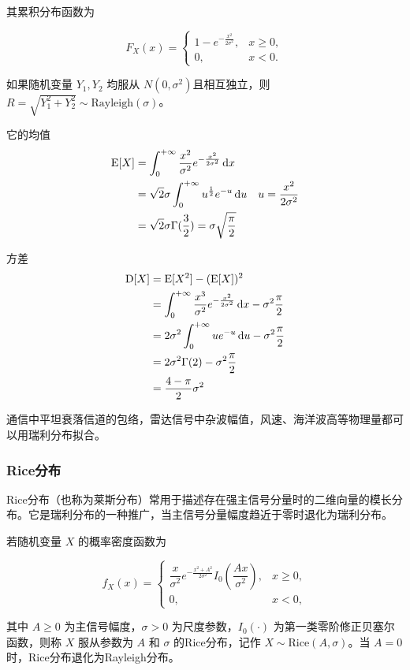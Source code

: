 其累积分布函数为

\[
F_X(x) = \begin{cases}
    1 - e^{-\frac{x^2}{2\sigma^2}}, & x \geq 0,\\
    0, & x < 0.
\end{cases}
\]

如果随机变量 $Y_1, Y_2$ 均服从 $N(0, \sigma^2)$且相互独立，则 $R = \sqrt{Y_1^2 + Y_2^2} \sim \mathrm{Rayleigh}(\sigma)$。

它的均值
\begin{align*}
\operatorname{E}[X] &= \int_{0}^{+\infty} \dfrac{x^2}{\sigma^2} e^{-\frac{x^2}{2\sigma^2}} \mathop{}\!\mathrm{d} x\\
&= \sqrt{2}\sigma\int_{0}^{+\infty} u^{\frac 12} e^{-u} \mathop{}\!\mathrm{d} u & u=\frac{x^2}{2\sigma^2}\\
&= \sqrt{2}\sigma \Gamma(\frac{3}{2}) = \sigma \sqrt{\frac{\pi}2}
\end{align*}

方差
\begin{align*}
\operatorname{D}[X] &= \operatorname{E}[X^2]- (\operatorname{E}[X])^2 \\
&= \int_{0}^{+\infty} \dfrac{x^3}{\sigma^2} e^{-\frac{x^2}{2\sigma^2}} \mathop{}\!\mathrm{d} x-\sigma^2 \frac{\pi}2\\
&= 2\sigma^2\int_{0}^{+\infty} ue^{-u} \mathop{}\!\mathrm{d} u - \sigma^2 \frac{\pi}2\\
&= 2\sigma^2\Gamma(2)-\sigma^2 \frac{\pi}2\\
&=\frac{4-\pi}{2}\sigma^2
\end{align*}

通信中平坦衰落信道的包络，雷达信号中杂波幅值，风速、海洋波高等物理量都可以用瑞利分布拟合。

\subsubsection{Rice分布}

Rice分布（也称为莱斯分布）常用于描述存在强主信号分量时的二维向量的模长分布。它是瑞利分布的一种推广，当主信号分量幅度趋近于零时退化为瑞利分布。

若随机变量 $X$ 的概率密度函数为

\[
f_X(x) = \begin{cases}
    \dfrac{x}{\sigma^2} e^{-\frac{x^2 + A^2}{2\sigma^2}} I_0\!\left(\dfrac{Ax}{\sigma^2}\right), & x \geq 0,\\
    0, & x < 0,
\end{cases}
\]

其中 $A \geq 0$ 为主信号幅度，$\sigma > 0$ 为尺度参数，$I_0(\cdot)$ 为第一类零阶修正贝塞尔函数，则称 $X$ 服从参数为 $A$ 和 $\sigma$ 的Rice分布，记作 $X \sim \mathrm{Rice}(A, \sigma)$。当 $A = 0$ 时，Rice分布退化为Rayleigh分布。


